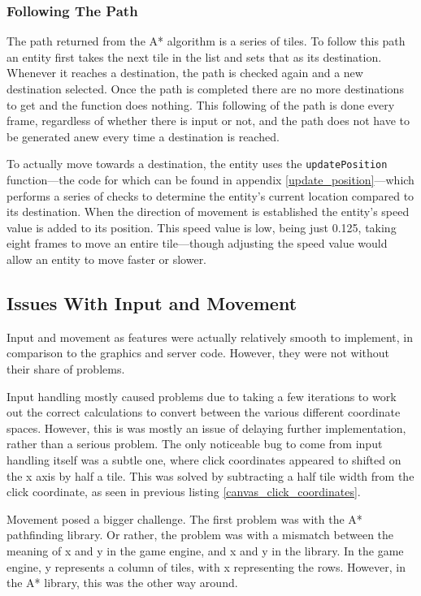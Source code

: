 \subsubsection{Following The Path}
The path returned from the A* algorithm is a series of tiles. To follow this path an entity first takes the next tile in the list and sets that as its destination. Whenever it reaches a destination, the path is checked again and a new destination selected. Once the path is completed there are no more destinations to get and the function does nothing. This following of the path is done every frame, regardless of whether there is input or not, and the path does not have to be generated anew every time a destination is reached.

To actually move towards a destination, the entity uses the \texttt{updatePosition} function---the code for which can be found in appendix \ref{update_position}---which performs a series of checks to determine the entity's current location compared to its destination. When the direction of movement is established the entity's speed value is added to its position. This speed value is low, being just 0.125, taking eight frames to move an entire tile---though adjusting the speed value would allow an entity to move faster or slower.

\subsection{Issues With Input and Movement}
Input and movement as features were actually relatively smooth to implement, in comparison to the graphics and server code. However, they were not without their share of problems.

Input handling mostly caused problems due to taking a few iterations to work out the correct calculations to convert between the various different coordinate spaces. However, this is was mostly an issue of delaying further implementation, rather than a serious problem. The only noticeable bug to come from input handling itself was a subtle one, where click coordinates appeared to shifted on the x axis by half a tile. This was solved by subtracting a half tile width from the click coordinate, as seen in previous listing \ref{canvas_click_coordinates}.

Movement posed a bigger challenge. The first problem was with the A* pathfinding library. Or rather, the problem was with a mismatch between the meaning of x and y in the game engine, and x and y in the library. In the game engine, y represents a column of tiles, with x representing the rows. However, in the A* library, this was the other way around.

